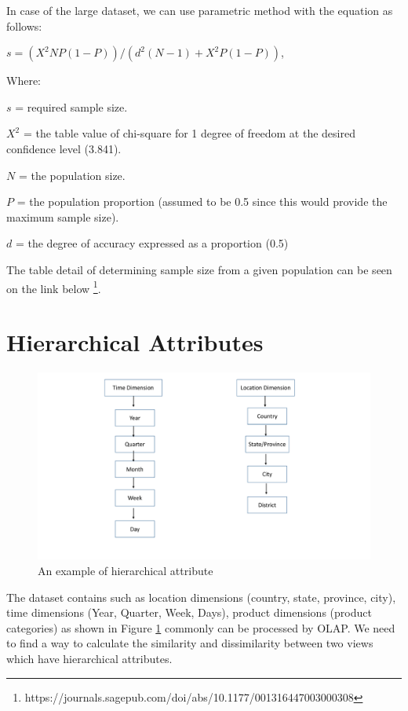 \documentclass{article}
\begin{document}
In case of the large dataset, we can use parametric method with the equation as follows:


$s = (X^2 NP(1-P)) / (d^2 (N -1) + X^2 P(1-P)) $, 

\noindent Where: 

$s$ = required sample size. 

$X^2$ = the table value of chi-square for 1 degree of freedom at the desired confidence level (3.841).

$N$ = the population size. 

$P$ = the population proportion (assumed to be 0.5 since this would provide the maximum sample size). 

$d$ = the degree of accuracy expressed as a proportion (0.5)

\noindent The table detail of determining sample size from a given population can be seen on the link below \footnote{https://journals.sagepub.com/doi/abs/10.1177/001316447003000308}. 


\section{Hierarchical Attributes}

\begin{figure}%
	\centering
	\includegraphics[width=5.2in]{figures/hirarki_atribut}
	\caption{An example of hierarchical attribute}
	\label{fig:hierarchial_attribute}%
\end{figure}


The dataset contains such as location dimensions (country, state, province, city), time dimensions (Year, Quarter, Week, Days), product dimensions (product categories) as shown in Figure \ref{fig:hierarchial_attribute} commonly can be processed by OLAP. We need to find a way to calculate the similarity and dissimilarity between two views which have hierarchical attributes.
\\
\end{document}
